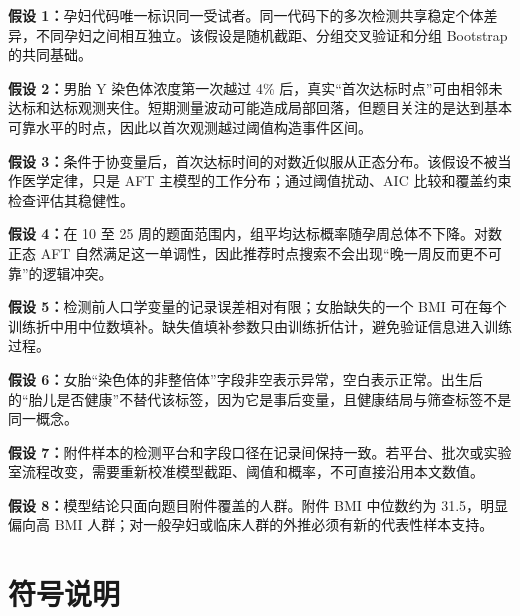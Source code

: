 \documentclass[UTF8,a4paper,12pt]{ctexart}
\begin{document}
\textbf{假设 1：}孕妇代码唯一标识同一受试者。同一代码下的多次检测共享稳定个体差异，不同孕妇之间相互独立。该假设是随机截距、分组交叉验证和分组 Bootstrap 的共同基础。

\textbf{假设 2：}男胎 Y 染色体浓度第一次越过 4\% 后，真实“首次达标时点”可由相邻未达标和达标观测夹住。短期测量波动可能造成局部回落，但题目关注的是达到基本可靠水平的时点，因此以首次观测越过阈值构造事件区间。

\textbf{假设 3：}条件于协变量后，首次达标时间的对数近似服从正态分布。该假设不被当作医学定律，只是 AFT 主模型的工作分布；通过阈值扰动、AIC 比较和覆盖约束检查评估其稳健性。

\textbf{假设 4：}在 10 至 25 周的题面范围内，组平均达标概率随孕周总体不下降。对数正态 AFT 自然满足这一单调性，因此推荐时点搜索不会出现“晚一周反而更不可靠”的逻辑冲突。

\textbf{假设 5：}检测前人口学变量的记录误差相对有限；女胎缺失的一个 BMI 可在每个训练折中用中位数填补。缺失值填补参数只由训练折估计，避免验证信息进入训练过程。

\textbf{假设 6：}女胎“染色体的非整倍体”字段非空表示异常，空白表示正常。出生后的“胎儿是否健康”不替代该标签，因为它是事后变量，且健康结局与筛查标签不是同一概念。

\textbf{假设 7：}附件样本的检测平台和字段口径在记录间保持一致。若平台、批次或实验室流程改变，需要重新校准模型截距、阈值和概率，不可直接沿用本文数值。

\textbf{假设 8：}模型结论只面向题目附件覆盖的人群。附件 BMI 中位数约为 31.5，明显偏向高 BMI 人群；对一般孕妇或临床人群的外推必须有新的代表性样本支持。

\section{符号说明}
\end{document}
